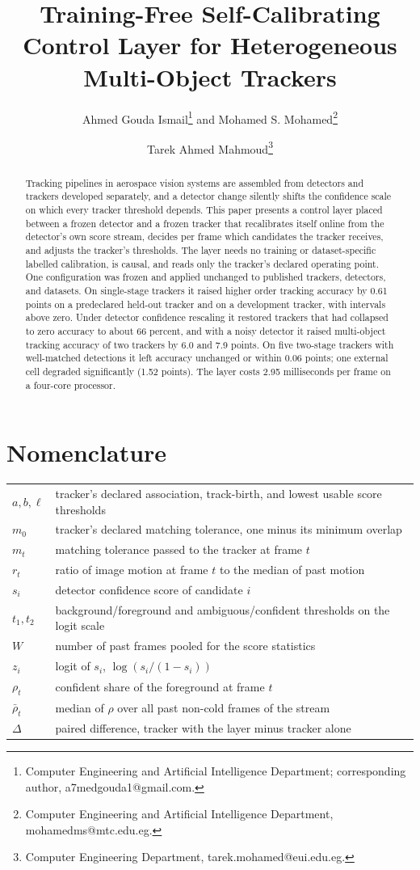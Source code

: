 \documentclass[journal]{new-aiaa}
\title{Training-Free Self-Calibrating Control Layer for Heterogeneous Multi-Object Trackers}
\author{Ahmed Gouda Ismail\footnote{Computer Engineering and Artificial Intelligence Department; corresponding author, a7medgouda1@gmail.com.} and Mohamed S. Mohamed\footnote{Computer Engineering and Artificial Intelligence Department, mohamedms@mtc.edu.eg.}}
\affil{Military Technical College, Cairo, Egypt}
\author{Tarek Ahmed Mahmoud\footnote{Computer Engineering Department, tarek.mohamed@eui.edu.eg.}}
\affil{Egypt University of Informatics, Cairo, Egypt}
\begin{document}
\maketitle

\begin{abstract}
Tracking pipelines in aerospace vision systems are assembled from detectors and trackers developed separately, and a detector change silently shifts the confidence scale on which every tracker threshold depends. This paper presents a control layer placed between a frozen detector and a frozen tracker that recalibrates itself online from the detector's own score stream, decides per frame which candidates the tracker receives, and adjusts the tracker's thresholds. The layer needs no training or dataset-specific labelled calibration, is causal, and reads only the tracker's declared operating point. One configuration was frozen and applied unchanged to published trackers, detectors, and datasets. On single-stage trackers it raised higher order tracking accuracy by 0.61 points on a predeclared held-out tracker and on a development tracker, with intervals above zero. Under detector confidence rescaling it restored trackers that had collapsed to zero accuracy to about 66 percent, and with a noisy detector it raised multi-object tracking accuracy of two trackers by 6.0 and 7.9 points. On five two-stage trackers with well-matched detections it left accuracy unchanged or within 0.06 points; one external cell degraded significantly (1.52 points). The layer costs 2.95 milliseconds per frame on a four-core processor.
\end{abstract}

\section*{Nomenclature}
{\renewcommand\arraystretch{1.0}
\noindent\begin{longtable}{@{}l @{\quad=\quad} l@{}}
$a, b, \ell$ & tracker's declared association, track-birth, and lowest usable score thresholds \\
$m_0$ & tracker's declared matching tolerance, one minus its minimum overlap \\
$m_t$ & matching tolerance passed to the tracker at frame $t$ \\
$r_t$ & ratio of image motion at frame $t$ to the median of past motion \\
$s_i$ & detector confidence score of candidate $i$ \\
$t_1, t_2$ & background/foreground and ambiguous/confident thresholds on the logit scale \\
$W$ & number of past frames pooled for the score statistics \\
$z_i$ & logit of $s_i$, $\log\left(s_i/(1-s_i)\right)$ \\
$\rho_t$ & confident share of the foreground at frame $t$ \\
$\bar\rho_t$ & median of $\rho$ over all past non-cold frames of the stream \\
$\Delta$ & paired difference, tracker with the layer minus tracker alone \\
\end{longtable}}
\addtocounter{table}{-1}
\end{document}
